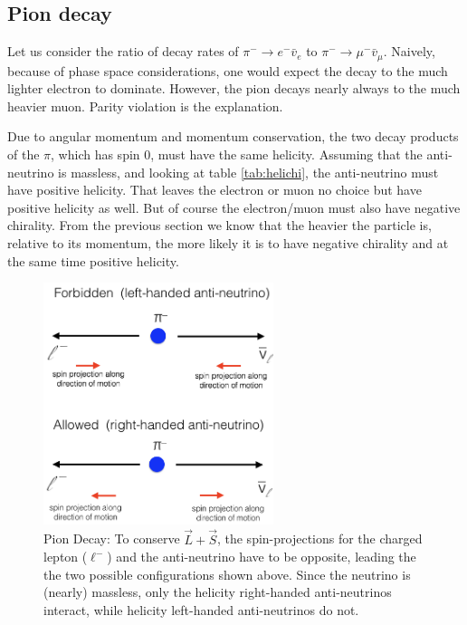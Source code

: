 \subsection{Pion decay} 
 Let us consider the ratio of decay rates of $\pi^- \to e^- \bar{v}_{e}$
 to $\pi^- \to \mu^- \bar{v}_{\mu}$. Naively, because of phase space
 considerations, one would expect the decay to the much lighter
 electron to dominate. However, the pion decays nearly always to the
 much heavier muon. Parity violation is the explanation.

 Due to angular momentum and momentum conservation, the two decay
 products of the $\pi$, which has spin 0, must have the same
 helicity. Assuming that the anti-neutrino is massless, and looking at
 table \ref{tab:helichi}, the anti-neutrino must have positive
 helicity. That leaves the electron or muon no choice but have
 positive helicity as well. But of course the electron/muon must also
 have negative chirality. From the previous section we know that the
 heavier the particle is, relative to its momentum, the more likely it
 is to have negative chirality and at the same time positive helicity.

\begin{figure}
\centering
\includegraphics[width=0.6\textwidth]{fig/0_pionDecay}
\caption[Pion Decay]{Pion Decay: To conserve $\vec{L} + \vec{S}$, the spin-projections for the charged lepton ($\ell^-$) and the anti-neutrino have to be opposite, leading the the two possible configurations shown above. Since the neutrino is (nearly) massless, only the helicity right-handed anti-neutrinos interact, while helicity left-handed anti-neutrinos do not.
\label{fig:my_label}}
\end{figure}

